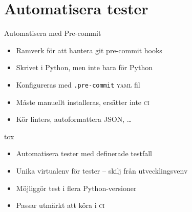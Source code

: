 \section{Automatisera tester}

\begin{frame}{Automatisera med Pre-commit}
  \begin{itemize}
    \item Ramverk för att hantera git pre-commit hooks
    \item Skrivet i Python, men inte bara för Python
    \item Konfigureras med \texttt{.pre-commit} \textsc{yaml} fil
    \item Måste manuellt installeras, ersätter inte \textsc{ci}
    \item Kör linters, autoformattera JSON, …
  \end{itemize}
\end{frame}



\begin{frame}{tox}
  \begin{itemize}
    \item Automatisera tester med definerade testfall
    \item Unika virtualenv för tester -- skilj från utvecklingsvenv
    \item Möjliggör test i flera Python-versioner
    \item Passar utmärkt att köra i \textsc{ci}
  \end{itemize}

\end{frame}

